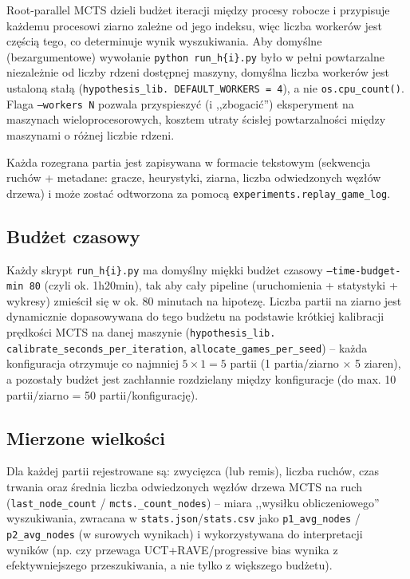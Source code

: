 \documentclass[11pt,a4paper]{article}
\begin{document}
Root-parallel MCTS dzieli budżet iteracji między procesy robocze i
przypisuje każdemu procesowi ziarno zależne od jego indeksu, więc liczba
workerów jest częścią tego, co determinuje wynik wyszukiwania. Aby
domyślne (bezargumentowe) wywołanie \texttt{python run\_h\{i\}.py} było w
pełni powtarzalne niezależnie od liczby rdzeni dostępnej maszyny, domyślna
liczba workerów jest ustaloną stałą (\texttt{hypothesis\_lib.\allowbreak
DEFAULT\_WORKERS = 4}), a nie \texttt{os.cpu\_count()}. Flaga
\texttt{--workers N} pozwala przyspieszyć (i ,,zbogacić'') eksperyment na
maszynach wieloprocesorowych, kosztem utraty ścisłej powtarzalności
między maszynami o różnej liczbie rdzeni.

Każda rozegrana partia jest zapisywana w formacie tekstowym (sekwencja
ruchów + metadane: gracze, heurystyki, ziarna, liczba odwiedzonych węzłów
drzewa) i może zostać odtworzona za pomocą
\texttt{experiments.replay\_game\_log}.

\subsection{Budżet czasowy}

Każdy skrypt \texttt{run\_h\{i\}.py} ma domyślny miękki budżet czasowy
\texttt{--time-budget-min~80} (czyli ok. 1h20min), tak aby cały
pipeline (uruchomienia + statystyki + wykresy) zmieścił się w ok.
80 minutach na hipotezę. Liczba partii na ziarno jest dynamicznie
dopasowywana do tego budżetu na podstawie krótkiej kalibracji prędkości
MCTS na danej maszynie (\texttt{hypothesis\_lib.\allowbreak
calibrate\_seconds\_per\_iteration},
\texttt{allocate\_games\_per\_seed}) -- każda konfiguracja otrzymuje co
najmniej $5 \times 1 = 5$ partii (1 partia/ziarno $\times$ 5 ziaren), a
pozostały budżet jest zachłannie rozdzielany między konfiguracje
(do max. 10 partii/ziarno = 50 partii/konfigurację).

\subsection{Mierzone wielkości}

Dla każdej partii rejestrowane są: zwycięzca (lub remis), liczba ruchów,
czas trwania oraz średnia liczba odwiedzonych węzłów drzewa MCTS na ruch
(\texttt{last\_node\_count} / \texttt{mcts.\_count\_nodes}) -- miara
,,wysiłku obliczeniowego'' wyszukiwania, zwracana w
\texttt{stats.json}/\texttt{stats.csv} jako \texttt{p1\_avg\_nodes} /
\texttt{p2\_avg\_nodes} (w surowych wynikach) i wykorzystywana do
interpretacji wyników (np. czy przewaga UCT+RAVE/progressive bias wynika
z efektywniejszego przeszukiwania, a nie tylko z większego budżetu).
\end{document}

